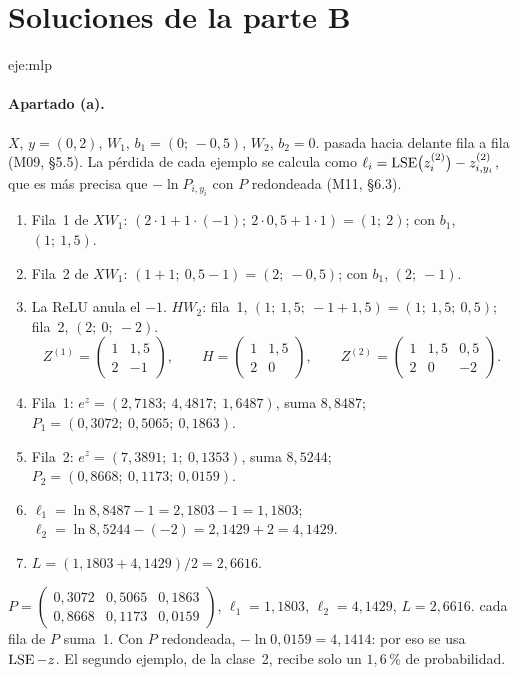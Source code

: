 \section{Soluciones de la parte B}
\label{sec:sol-problemas}

\begin{solucion}{eje:mlp}
\paragraph{Apartado (a).}
\datos $X$, $y=(0,2)$, $W_1$, $b_1=(0;\,-0{,}5)$, $W_2$, $b_2=0$.
\planteamiento pasada hacia delante fila a fila (M09, §5.5). La pérdida de cada ejemplo se calcula como $\ell_i=\operatorname{LSE}\bigl(z^{(2)}_i\bigr)-z^{(2)}_{i,y_i}$, que es más precisa que $-\ln P_{i,y_i}$ con $P$ redondeada (M11, §6.3).
\pasos
\begin{enumerate}[label=\arabic*.]
  \item Fila~1 de $XW_1$: $(2\cdot 1+1\cdot(-1);\allowbreak\ 2\cdot 0{,}5+1\cdot 1)=(1;\allowbreak\ 2)$; con $b_1$, $(1;\allowbreak\ 1{,}5)$.
  \item Fila~2 de $XW_1$: $(1+1;\allowbreak\ 0{,}5-1)=(2;\allowbreak\ -0{,}5)$; con $b_1$, $(2;\allowbreak\ -1)$.
  \item La ReLU anula el $-1$. $HW_2$: fila~1, $(1;\allowbreak\ 1{,}5;\allowbreak\ -1+1{,}5)=(1;\allowbreak\ 1{,}5;\allowbreak\ 0{,}5)$; fila~2, $(2;\allowbreak\ 0;\allowbreak\ -2)$.
  \[
  Z^{(1)}=\begin{pmatrix}1&1{,}5\\2&-1\end{pmatrix},\qquad H=\begin{pmatrix}1&1{,}5\\2&0\end{pmatrix},\qquad Z^{(2)}=\begin{pmatrix}1&1{,}5&0{,}5\\2&0&-2\end{pmatrix}.
  \]
  \item Fila~1: $e^{z}=(2{,}7183;\allowbreak\ 4{,}4817;\allowbreak\ 1{,}6487)$, suma $8{,}8487$; $P_1=(0{,}3072;\allowbreak\ 0{,}5065;\allowbreak\ 0{,}1863)$.
  \item Fila~2: $e^{z}=(7{,}3891;\allowbreak\ 1;\allowbreak\ 0{,}1353)$, suma $8{,}5244$; $P_2=(0{,}8668;\allowbreak\ 0{,}1173;\allowbreak\ 0{,}0159)$.
  \item $\ell_1=\ln 8{,}8487-1=2{,}1803-1=1{,}1803$; $\ell_2=\ln 8{,}5244-(-2)=2{,}1429+2=4{,}1429$.
  \item $L=(1{,}1803+4{,}1429)/2=2{,}6616$.
\end{enumerate}
\resultado $P=\begin{pmatrix}0{,}3072&0{,}5065&0{,}1863\\0{,}8668&0{,}1173&0{,}0159\end{pmatrix}$, $\ell_1=1{,}1803$, $\ell_2=4{,}1429$, $L=2{,}6616$.
\comprobacion cada fila de $P$ suma~1. Con $P$ redondeada, $-\ln 0{,}0159=4{,}1414$: por eso se usa $\operatorname{LSE}-z$. El segundo ejemplo, de la clase~2, recibe solo un $1{,}6\,\%$ de probabilidad.


\end{solucion}
